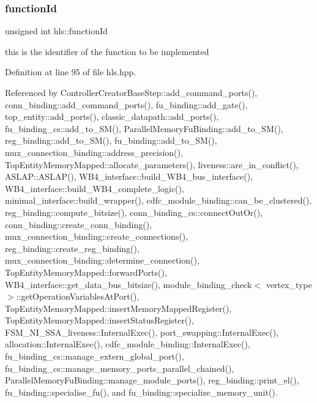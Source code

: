 \mbox{\label{classhls_a0eaba14187fb5e60a90d3f35d2b138e0}} 
\subsubsection{\texorpdfstring{function\+Id}{functionId}}
{\footnotesize\ttfamily unsigned int hls\+::function\+Id}



this is the identifier of the function to be implemented 



Definition at line 95 of file hls.\+hpp.



Referenced by Controller\+Creator\+Base\+Step\+::add\+\_\+command\+\_\+ports(), conn\+\_\+binding\+::add\+\_\+command\+\_\+ports(), fu\+\_\+binding\+::add\+\_\+gate(), top\+\_\+entity\+::add\+\_\+ports(), classic\+\_\+datapath\+::add\+\_\+ports(), fu\+\_\+binding\+\_\+cs\+::add\+\_\+to\+\_\+\+S\+M(), Parallel\+Memory\+Fu\+Binding\+::add\+\_\+to\+\_\+\+S\+M(), reg\+\_\+binding\+::add\+\_\+to\+\_\+\+S\+M(), fu\+\_\+binding\+::add\+\_\+to\+\_\+\+S\+M(), mux\+\_\+connection\+\_\+binding\+::address\+\_\+precision(), Top\+Entity\+Memory\+Mapped\+::allocate\+\_\+parameters(), liveness\+::are\+\_\+in\+\_\+conflict(), A\+S\+L\+A\+P\+::\+A\+S\+L\+A\+P(), W\+B4\+\_\+interface\+::build\+\_\+\+W\+B4\+\_\+bus\+\_\+interface(), W\+B4\+\_\+interface\+::build\+\_\+\+W\+B4\+\_\+complete\+\_\+logic(), minimal\+\_\+interface\+::build\+\_\+wrapper(), cdfc\+\_\+module\+\_\+binding\+::can\+\_\+be\+\_\+clustered(), reg\+\_\+binding\+::compute\+\_\+bitsize(), conn\+\_\+binding\+\_\+cs\+::connect\+Out\+Or(), conn\+\_\+binding\+::create\+\_\+conn\+\_\+binding(), mux\+\_\+connection\+\_\+binding\+::create\+\_\+connections(), reg\+\_\+binding\+::create\+\_\+reg\+\_\+binding(), mux\+\_\+connection\+\_\+binding\+::determine\+\_\+connection(), Top\+Entity\+Memory\+Mapped\+::forward\+Ports(), W\+B4\+\_\+interface\+::get\+\_\+data\+\_\+bus\+\_\+bitsize(), module\+\_\+binding\+\_\+check$<$ vertex\+\_\+type $>$\+::get\+Operation\+Variables\+At\+Port(), Top\+Entity\+Memory\+Mapped\+::insert\+Memory\+Mapped\+Register(), Top\+Entity\+Memory\+Mapped\+::insert\+Status\+Register(), F\+S\+M\+\_\+\+N\+I\+\_\+\+S\+S\+A\+\_\+liveness\+::\+Internal\+Exec(), port\+\_\+swapping\+::\+Internal\+Exec(), allocation\+::\+Internal\+Exec(), cdfc\+\_\+module\+\_\+binding\+::\+Internal\+Exec(), fu\+\_\+binding\+\_\+cs\+::manage\+\_\+extern\+\_\+global\+\_\+port(), fu\+\_\+binding\+\_\+cs\+::manage\+\_\+memory\+\_\+ports\+\_\+parallel\+\_\+chained(), Parallel\+Memory\+Fu\+Binding\+::manage\+\_\+module\+\_\+ports(), reg\+\_\+binding\+::print\+\_\+el(), fu\+\_\+binding\+::specialise\+\_\+fu(), and fu\+\_\+binding\+::specialize\+\_\+memory\+\_\+unit().


